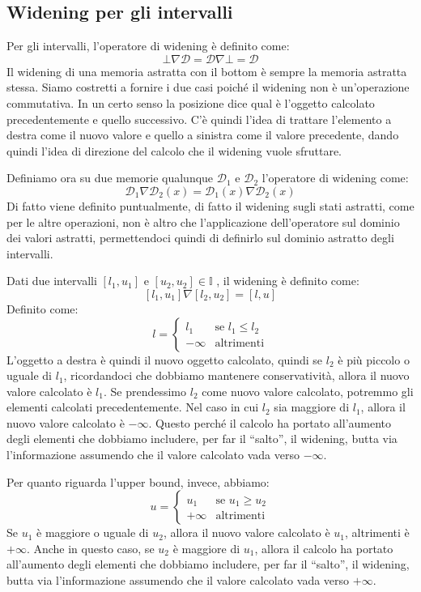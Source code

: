 \subsection{Widening per gli intervalli}
Per gli intervalli, l'operatore di widening è definito come:
\[
  \bot \nabla \mathcal{D} = \mathcal{D} \nabla \bot = \mathcal{D}
\]
Il widening di una memoria astratta con il bottom è sempre la
memoria astratta stessa. Siamo costretti a fornire i due casi 
poiché il widening non è un'operazione commutativa.
In un certo senso la posizione dice qual è l'oggetto calcolato precedentemente 
e quello successivo. C'è quindi l'idea di trattare l'elemento a 
destra come il nuovo valore e quello a sinistra come il
valore precedente, dando quindi l'idea di direzione del calcolo 
che il widening vuole sfruttare.

Definiamo ora su due memorie qualunque $\mathcal{D}_1$ e $\mathcal{D}_2$
l'operatore di widening come:
\[
  \mathcal{D}_1 \nabla \mathcal{D}_2(x) =
  \mathcal{D}_1(x) \nabla \mathcal{D}_2(x)
\]
Di fatto viene definito puntualmente, di fatto il widening sugli stati astratti,
come per le altre operazioni, non è altro che l'applicazione
dell'operatore sul dominio dei valori astratti, permettendoci quindi 
di definirlo sul dominio astratto degli intervalli.

Dati due intervalli $[l_1, u_1]$ e $[u_2, u_2] \in \mathbb{I}$ , il widening è definito come:
\[
  [l_1, u_1] \nabla [l_2, u_2] = [l , u]
\]
Definito come:
\[
  l = \begin{cases}
    l_1 & \text{se } l_1 \leq l_2 \\
    -\infty & \text{altrimenti}
  \end{cases}
\]
L'oggetto a destra è quindi il nuovo oggetto calcolato, 
quindi se $l_2$ è più piccolo o uguale di $l_1$, 
ricordandoci che dobbiamo mantenere conservatività, 
allora il nuovo valore calcolato è $l_1$. Se prendessimo 
$l_2$ come nuovo valore calcolato, potremmo gli 
elementi calcolati precedentemente. 
Nel caso in cui $l_2$ sia maggiore di $l_1$,
allora il nuovo valore calcolato è $-\infty$. Questo perché 
il calcolo ha portato all'aumento degli elementi che dobbiamo includere,
per far il ``salto'', il widening, butta via l'informazione 
assumendo che il valore calcolato vada verso $-\infty$.

Per quanto riguarda l'upper bound, invece, abbiamo:
\[
  u = \begin{cases}
    u_1 & \text{se } u_1 \geq u_2 \\
    +\infty & \text{altrimenti}
  \end{cases}
\]
Se $u_1$ è maggiore o uguale di $u_2$, allora il nuovo valore calcolato
è $u_1$, altrimenti è $+\infty$. Anche in questo caso, se $u_2$ è maggiore di $u_1$,
allora il calcolo ha portato all'aumento degli elementi che dobbiamo includere,
per far il ``salto'', il widening, butta via l'informazione
assumendo che il valore calcolato vada verso $+\infty$.

